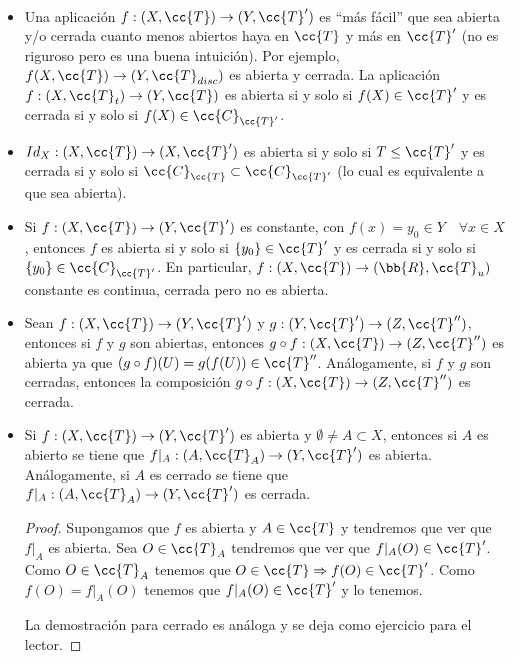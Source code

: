 \begin{ejemplo}\
    \begin{itemize}
        \item Una aplicación $f: (X, \cc{T}) \to (Y, \cc{T}')$ es ``más fácil'' que sea abierta y/o cerrada cuanto menos abiertos haya en $\cc{T}$ y más en $\cc{T}'$ (no es riguroso pero es una buena intuición). Por ejemplo, $f(X, \cc{T})\to (Y, \cc{T}_{disc})$ es abierta y cerrada.
        La aplicación $f:(X, \cc{T}_t) \to (Y, \cc{T})$ es abierta si y solo si $f(X)\in \cc{T}'$ y es cerrada si y solo si $f(X)\in \cc{C}_{\cc{T}'}$.

        \item $Id_X :  (X, \cc{T})\to (X, \cc{T}')$ es abierta si y solo si $T \leq \cc{T}'$ y es cerrada si y solo si $\cc{C}_{\cc{T}}\subset \cc{C}_{\cc{T}'}$ (lo cual es equivalente a que sea abierta).

        \item Si $f:(X, \cc{T})\to (Y, \cc{T}')$ es constante, con $f(x)=y_0\in Y$\ \ $\forall x \in X$, entonces $f$ es abierta si y solo si $\{y_0\}\in \cc{T}'$ y es cerrada si y solo si $\{y_0\}\in \cc{C}_{\cc{T}'}$. En particular, $f:(X, \cc{T})\to (\bb{R}, \cc{T}_u)$ constante es continua, cerrada pero no es abierta.

        \item Sean $f:(X, \cc{T})\to (Y,\cc{T}')$ y $g:(Y,\cc{T}')\to (Z, \cc{T}'')$, entonces si $f $ y $ g$ son abiertas, entonces $g\circ f:(X, \cc{T})\to (Z, \cc{T}'')$ es abierta ya que $(g\circ f)(U)=g(f(U))\in \cc{T}''$. Análogamente, si $f$ y $g$ son cerradas, entonces la composición $g\circ f:(X, \cc{T})\to (Z, \cc{T}'')$ es cerrada.

        \item Si $f:(X, \cc{T})\to (Y, \cc{T}')$ es abierta y $\emptyset \neq A \subset X$, entonces si $A$ es abierto se tiene que $f|_{A}:(A, \cc{T}_A)\to (Y, \cc{T}')$ es abierta. Análogamente, si $A$ es cerrado se tiene que $f|_{A}:(A, \cc{T}_A)\to (Y, \cc{T}')$ es cerrada.
        \begin{proof}
            Supongamos que $f$ es abierta y $A\in \cc{T}$ y tendremos que ver que $f|_{A}$ es abierta. Sea $O\in \cc{T}_A$ tendremos que ver que $f|_{A}(O)\in \cc{T}'$. Como $O\in \cc{T}_A$ tenemos que $O\in \cc{T} \Rightarrow f(O)\in \cc{T}'$. Como $f(O)=f|_{A}(O)$ tenemos que $f|_{A}(O)\in \cc{T}'$ y lo tenemos. 

            La demostración para cerrado es análoga y se deja como ejercicio para el lector.
        \end{proof}


\end{itemize}
\end{ejemplo}
